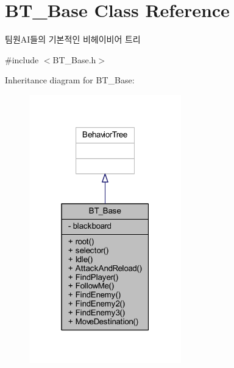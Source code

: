 \hypertarget{class_b_t___base}{}\section{B\+T\+\_\+\+Base Class Reference}
\label{class_b_t___base}


팀원\+A\+I들의 기본적인 비헤이비어 트리  




{\ttfamily \#include $<$B\+T\+\_\+\+Base.\+h$>$}



Inheritance diagram for B\+T\+\_\+\+Base\+:\nopagebreak
\begin{figure}[H]
\begin{center}
\leavevmode
\includegraphics[width=187pt]{class_b_t___base__inherit__graph}
\end{center}
\end{figure}


